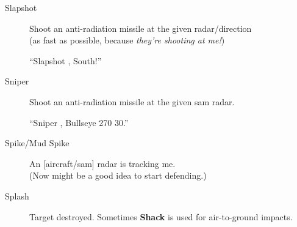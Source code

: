 \begin{description}
\item[Slapshot] Shoot an anti-radiation missile at the given radar/direction \\
    (as fast as possible, because \emph{they're shooting at me!})

    ``Slapshot , South!''

\item[Sniper] Shoot an anti-radiation missile at the given \ac{sam} radar.

    ``Sniper , Bullseye 270 30.''

\item[Spike/Mud Spike] An [aircraft/\ac{sam}] radar is tracking me. \\
    (Now might be a good idea to start defending.)

\item[Splash] Target destroyed. Sometimes \textbf{Shack} is used for
    air-to-ground impacts.

\end{description}
